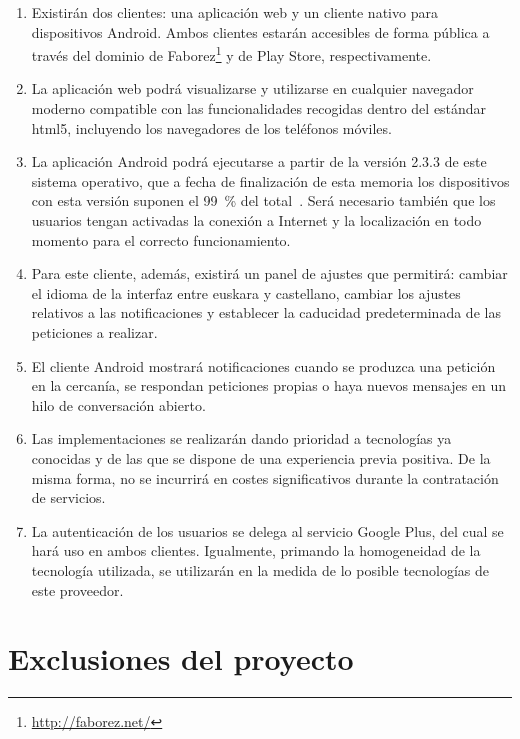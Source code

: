 \documentclass[main]{subfiles}
\begin{document}
\begin{enumerate}

  \item Existirán dos clientes: una aplicación web y un cliente nativo para dispositivos Android. Ambos clientes estarán accesibles de forma pública a través del dominio de Faborez\footnote{\url{http://faborez.net/}} y de Play Store, respectivamente.
  
  \item La aplicación web podrá visualizarse y utilizarse en cualquier navegador moderno compatible con las funcionalidades recogidas dentro del estándar \gls{html5}, incluyendo los navegadores de los teléfonos móviles.
  
  \item La aplicación Android podrá ejecutarse a partir de la versión 2.3.3 de este sistema operativo, que a fecha de finalización de esta memoria los dispositivos con esta versión suponen el 99~\% del total~\autocite{android-versions}. Será necesario también que los usuarios tengan activadas la conexión a Internet y la localización en todo momento para el correcto funcionamiento.
  
  \item Para este cliente, además, existirá un panel de ajustes que permitirá: cambiar el idioma de la interfaz entre euskara y castellano, cambiar los ajustes relativos a las notificaciones y establecer la caducidad predeterminada de las peticiones a realizar.
  
  \item El cliente Android mostrará notificaciones cuando se produzca una petición en la cercanía, se respondan peticiones propias o haya nuevos mensajes en un hilo de conversación abierto.
  
  \item Las implementaciones se realizarán dando prioridad a tecnologías ya conocidas y de las que se dispone de una experiencia previa positiva. De la misma forma, no se incurrirá en costes significativos durante la contratación de servicios.
  
  \item La autenticación de los usuarios se delega al servicio Google Plus, del cual se hará uso en ambos clientes. Igualmente, primando la homogeneidad de la tecnología utilizada, se utilizarán en la medida de lo posible tecnologías de este proveedor.

\end{enumerate}


\section{Exclusiones del proyecto}
\end{document}
